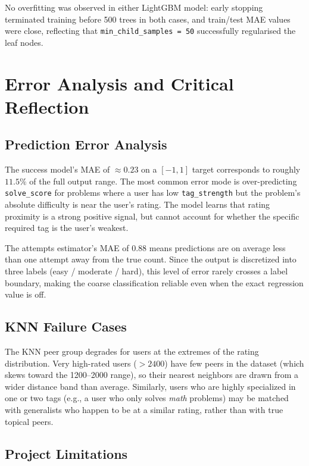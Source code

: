 \documentclass[12pt,a4paper]{article}
\begin{document}
No overfitting was observed in either LightGBM model: early stopping terminated
training before 500 trees in both cases, and train/test MAE values were close,
reflecting that \texttt{min\_child\_samples = 50} successfully regularised the
leaf nodes.

\section{Error Analysis and Critical Reflection}

\subsection*{Prediction Error Analysis}

The success model's MAE of ${\approx}0.23$ on a $[-1,1]$ target corresponds to
roughly $11.5\%$ of the full output range. The most common error mode is
over-predicting \texttt{solve\_score} for problems where a user has low
\texttt{tag\_strength} but the problem's absolute difficulty is near the user's
rating. The model learns that rating proximity is a strong positive signal, but
cannot account for whether the specific required tag is the user's weakest.

The attempts estimator's MAE of $0.88$ means predictions are on average less
than one attempt away from the true count. Since the output is discretized into
three labels (easy / moderate / hard), this level of error rarely crosses a
label boundary, making the coarse classification reliable even when the exact
regression value is off.

\subsection*{KNN Failure Cases}

The KNN peer group degrades for users at the extremes of the rating
distribution. Very high-rated users ($>2400$) have few peers in the dataset
(which skews toward the 1200--2000 range), so their nearest neighbors are drawn
from a wider distance band than average. Similarly, users who are highly
specialized in one or two tags (e.g., a user who only solves \textit{math}
problems) may be matched with generalists who happen to be at a similar rating,
rather than with true topical peers.

\subsection*{Project Limitations}
\end{document}
